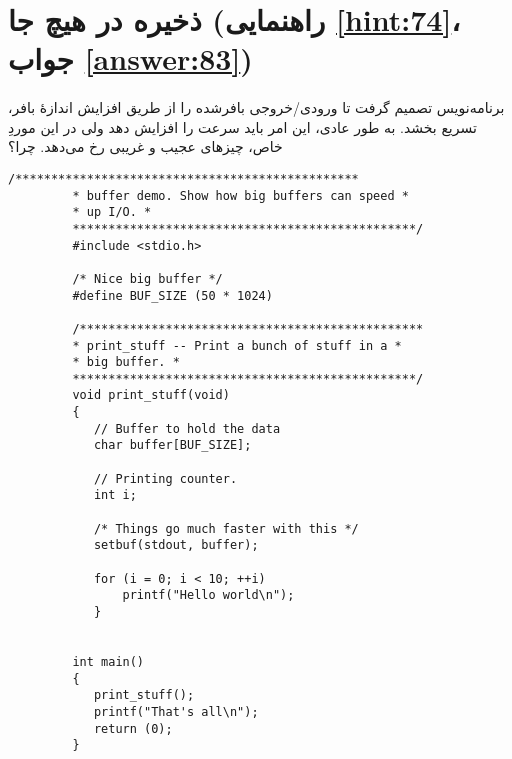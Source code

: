 \section[ذخیره در هیچ جا]{ذخیره در هیچ جا \protect{} (راهنمایی \ref{hint:74}، جواب \ref{answer:83})}
\paragraph{}\label{prog:66}
برنامه‌نویس تصمیم گرفت تا ورودی/خروجی بافرشده را از طریق افزایش اندازهٔ بافر، تسریع بخشد. به طور عادی، این امر باید سرعت را افزایش دهد ولی در این موردِ خاص، چیزهای عجیب و غریبی رخ می‌دهد. چرا؟

\begin{LTR}
    \begin{lstlisting}[style=C++Style]
         /************************************************
         * buffer demo. Show how big buffers can speed *
         * up I/O. *
         ************************************************/
         #include <stdio.h>

         /* Nice big buffer */
         #define BUF_SIZE (50 * 1024)

         /************************************************
         * print_stuff -- Print a bunch of stuff in a *
         * big buffer. *
         ************************************************/
         void print_stuff(void)
         {
         	// Buffer to hold the data
         	char buffer[BUF_SIZE];

         	// Printing counter.
         	int i;

         	/* Things go much faster with this */
         	setbuf(stdout, buffer);

         	for (i = 0; i < 10; ++i)
         		printf("Hello world\n");
         	}


         int main()
         {
         	print_stuff();
         	printf("That's all\n");
         	return (0);
         }
    \end{lstlisting}
\end{LTR}